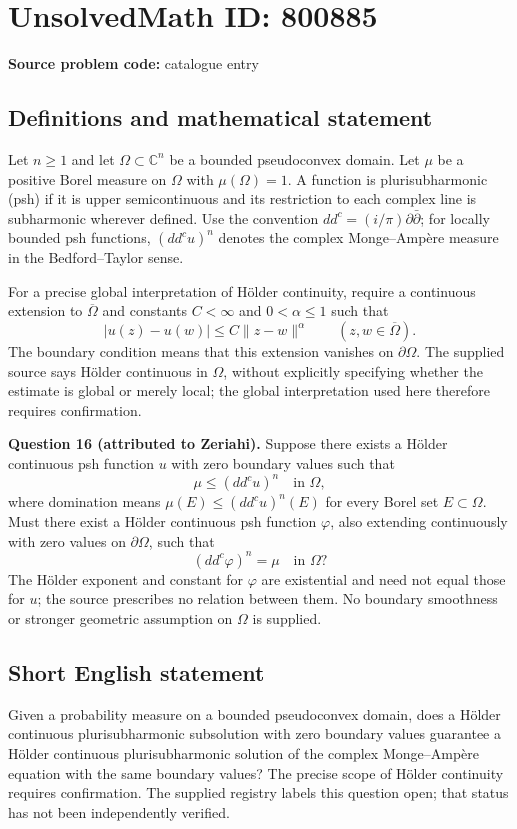\documentclass[11pt]{article}
\newcommand{\C}{\mathbb{C}}
\begin{document}
\section*{UnsolvedMath ID: 800885}
\textbf{Source problem code:} catalogue entry
\subsection{Definitions and mathematical statement}
Let \(n\geq 1\) and let \(\Omega\subset\C^n\) be a bounded pseudoconvex domain. Let \(\mu\) be a positive Borel measure on \(\Omega\) with \(\mu(\Omega)=1\). A function is plurisubharmonic (psh) if it is upper semicontinuous and its restriction to each complex line is subharmonic wherever defined. Use the convention \(dd^c=(i/\pi)\partial\bar\partial\); for locally bounded psh functions, \((dd^c u)^n\) denotes the complex Monge--Amp\`ere measure in the Bedford--Taylor sense.

For a precise global interpretation of H\"older continuity, require a continuous extension to \(\overline\Omega\) and constants \(C<\infty\) and \(0<\alpha\leq 1\) such that
\[
 |u(z)-u(w)|\leq C\lVert z-w\rVert^\alpha
 \qquad(z,w\in\overline\Omega).
\]
The boundary condition means that this extension vanishes on \(\partial\Omega\). The supplied source says H\"older continuous in \(\Omega\), without explicitly specifying whether the estimate is global or merely local; the global interpretation used here therefore requires confirmation.

\textbf{Question 16 (attributed to Zeriahi).} Suppose there exists a H\"older continuous psh function \(u\) with zero boundary values such that
\[
 \mu\leq(dd^c u)^n\quad\text{in }\Omega,
\]
where domination means \(\mu(E)\leq(dd^c u)^n(E)\) for every Borel set \(E\subset\Omega\). Must there exist a H\"older continuous psh function \(\varphi\), also extending continuously with zero values on \(\partial\Omega\), such that
\[
 (dd^c\varphi)^n=\mu\quad\text{in }\Omega?
\]
The H\"older exponent and constant for \(\varphi\) are existential and need not equal those for \(u\); the source prescribes no relation between them. No boundary smoothness or stronger geometric assumption on \(\Omega\) is supplied.
\subsection{Short English statement}
Given a probability measure on a bounded pseudoconvex domain, does a H\"older continuous plurisubharmonic subsolution with zero boundary values guarantee a H\"older continuous plurisubharmonic solution of the complex Monge--Amp\`ere equation with the same boundary values? The precise scope of H\"older continuity requires confirmation. The supplied registry labels this question open; that status has not been independently verified.
\end{document}
